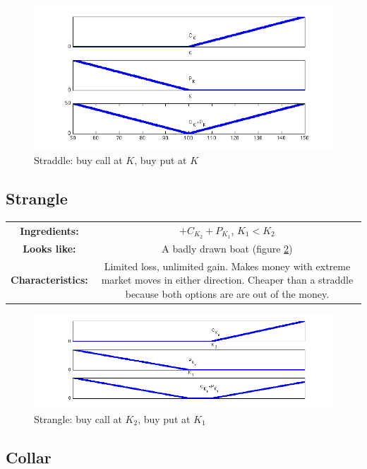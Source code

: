  \begin{figure}[ht]
\centering
  \includegraphics[width=5in] {pics/CpP}
\caption{Straddle: buy call at $K$, buy put at $K$}
\label{fig:CpP}
\end{figure}


\subsection{Strangle}

\begin{center}
\begin{tabular}{|cc|}
\hline
\textbf{Ingredients:} & $+C_{K_2} +P_{K_1}$, $K_1<K_2$\\
\textbf{Looks like:}  & A badly drawn boat (figure \ref{fig:CK2pPK1})\\
\textbf{Characteristics:} & \parbox{3in}{Limited loss, unlimited gain. Makes money with extreme market moves in either direction. Cheaper than a straddle because both options are are out of the money.}\\
\hline
\end{tabular}
\end{center}


  \begin{figure}[ht]
\centering
  \includegraphics[width=5in] {pics/CK2pPK1}
\caption{Strangle: buy call at $K_2$, buy put at $K_1$}
\label{fig:CK2pPK1}
\end{figure}

\subsection{Collar}

